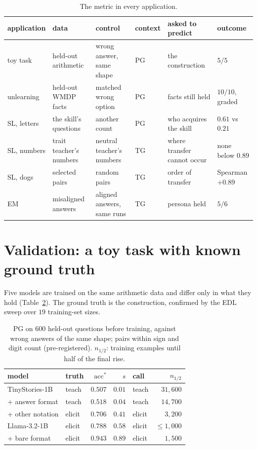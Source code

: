 \documentclass{article}
\theoremstyle{definition}
\newcommand{\acc}{\mathrm{acc}^*}
\begin{document}
\begin{table}[t]
\centering
\small
\begin{tabular}{llllll}
\toprule
application & data & control & context & asked to predict & outcome \\
\midrule
toy task & held-out arithmetic & wrong answer, same shape & PG & the construction & $5/5$ \\
unlearning & held-out WMDP facts & matched wrong option & PG & facts still held & $10/10$, graded \\
SL, letters & the skill's questions & another count & PG & who acquires the skill & $0.61$ vs $0.21$ \\
SL, numbers & trait teacher's numbers & neutral teacher's numbers & TG & where transfer cannot occur & none below $0.89$ \\
SL, dogs & selected pairs & random pairs & TG & order of transfer & Spearman $+0.89$ \\
EM & misaligned answers & aligned answers, same runs & TG & persona held & $5/6$ \\
\bottomrule
\end{tabular}
\caption{The metric in every application.}
\label{tab:apps}
\end{table}

\section{Validation: a toy task with known ground truth}
\label{sec:toy}

Five models are trained on the same arithmetic data and differ only in what they hold
(Table~\ref{tab:toy}). The ground truth is the construction, confirmed by the EDL sweep over $19$ training-set
sizes.

\begin{table}[t]
\centering
\small
\setlength{\tabcolsep}{4pt}
\begin{tabular}{llrrlr}
\toprule
model & truth & $\acc$ & $s$ & call & $n_{1/2}$ \\
\midrule
TinyStories-1B & teach & $0.507$ & $0.01$ & teach & $31{,}600$ \\
\; + answer format & teach & $0.518$ & $0.04$ & teach & $14{,}700$ \\
\; + other notation & elicit & $0.706$ & $0.41$ & elicit & $3{,}200$ \\
Llama-3.2-1B & elicit & $0.788$ & $0.58$ & elicit & $\le1{,}000$ \\
\; + bare format & elicit & $0.943$ & $0.89$ & elicit & $1{,}500$ \\
\bottomrule
\end{tabular}
\caption{PG on $600$ held-out questions before training, against wrong answers of the same shape; pairs within
sign and digit count (pre-registered). $n_{1/2}$: training examples until half of the final rise.}
\label{tab:toy}
\end{table}
\end{document}
